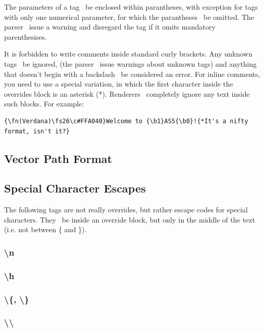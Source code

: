 \documentclass{spec}
\begin{document}
The parameters of a tag \must\ be enclosed within parantheses, with exception for tags with only one numerical
parameter, for which the parantheses \may\ be omitted. The parser \must\ issue a warning and disregard the tag
if it omits mandatory parenthesises.

It is forbidden to write comments inside standard curly brackets. Any unknown tags \must\ be ignored,
(the parser \should\ issue warnings about unknown tags) and anything that doesn't begin with a backslash
\must\ be considered an error. For inline comments, you need to use a special variation, in which the
first character inside the overrides block is an asterisk (*). Renderers \must\ completely ignore
any text inside such blocks. For example:

\begin{verbatim}
{\fn(Verdana)\fs26\c#FFA040}Welcome to {\b1}AS5{\b0}!{*It's a nifty format, isn't it?}
\end{verbatim}


\subsection{Vector Path Format}


\subsection{Special Character Escapes}
The following tags are not really overrides, but rather escape codes for special characters. They
\mustnot\ be inside an override block, but only in the middle of the text (i.e. not between \{ and \}).


\subsubsection{\textbackslash n}

\subsubsection{\textbackslash h}

\subsubsection{\textbackslash \{, \textbackslash \}}

\subsubsection{\textbackslash \textbackslash}
\end{document}
